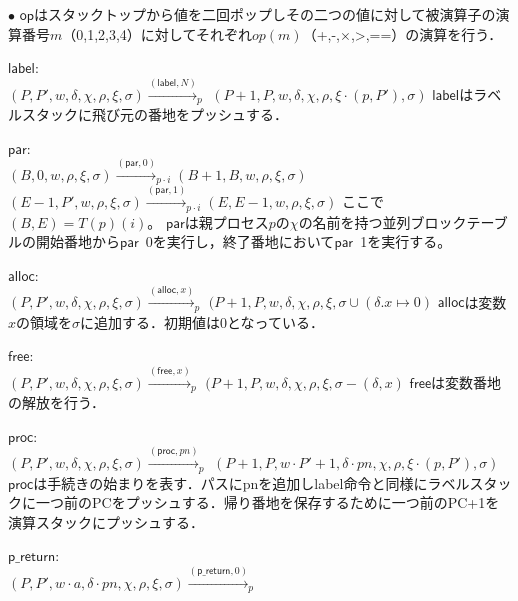 \documentclass[submit,PRO]{ipsj}
\newcommand{\bcode}[1]{$\mathsf{#1}$}
\begin{document}
\begin{list}{$\bullet$}{}
\bcode{op}はスタックトップから値を二回ポップしその二つの値に対して被演算子の演算番号$m$（0,1,2,3,4）に対してそれぞれ$op(m)$（+,-,$\times$,>,==）の演算を行う．
\item \bcode{label}:\\
$(P,P',w,\delta,\chi,\rho,\xi,\sigma)\xrightarrow{(\mathsf{label},N)}_p$\newline
\qquad$(P+1,P,w,\delta,\chi,\rho,\xi\cdot(p,P'),\sigma)$\newline
\bcode{label}はラベルスタックに飛び元の番地をプッシュする．
\item \bcode{par}:\\
$(B,0,w,\rho,\xi,\sigma)\xrightarrow{(\mathsf{par},0)}_{p\cdot i}(B+1,B,w,\rho,\xi,\sigma)$\newline
$(E-1,P',w,\rho,\xi,\sigma)\xrightarrow{(\mathsf{par},1)}_{p\cdot i}(E,E-1,w,\rho,\xi,\sigma)$\newline
ここで$(B,E)=T(p)(i)$。
\bcode{par}は親プロセス$p$の$\chi$の名前を持つ並列ブロックテーブルの開始番地から\bcode{par}\ 0を実行し，終了番地において\bcode{par}\ 1を実行する。
\item \bcode{alloc}:\\
$(P,P',w,\delta,\chi,\rho,\xi,\sigma)\xrightarrow{(\mathsf{alloc},x)}_p$\newline
\qquad $(P+1,P,w,\delta,\chi,\rho,\xi,\sigma\cup(\delta.x\mapsto 0)$\newline
\bcode{alloc}は変数$x$の領域を$\sigma$に追加する．初期値は0となっている．
\item \bcode{free}:\\
$(P,P',w,\delta,\chi,\rho,\xi,\sigma)\xrightarrow{(\mathsf{free},x)}_p$\newline
\qquad $(P+1,P,w,\delta,\chi,\rho,\xi,\sigma-(\delta,x)$\newline
\bcode{free}は変数番地の解放を行う．
\item \bcode{proc}:\\
$(P,P',w,\delta,\chi,\rho,\xi,\sigma)\xrightarrow{(\mathsf{proc},pn)}_p$\newline
\qquad $(P+1,P,w\cdot P'+1,\delta\cdot pn,\chi,\rho,\xi\cdot(p,P'),\sigma)$\newline
\bcode{proc}は手続きの始まりを表す．パスにpnを追加しlabel命令と同様にラベルスタックに一つ前のPCをプッシュする．帰り番地を保存するために一つ前のPC+1を演算スタックにプッシュする．
\item \bcode{p\_return}:\\
$(P,P',w\cdot a,\delta\cdot pn,\chi,\rho,\xi,\sigma)\xrightarrow{(\mathsf{p\_return},0)}_p$\newline

\end{list}
\end{document}

